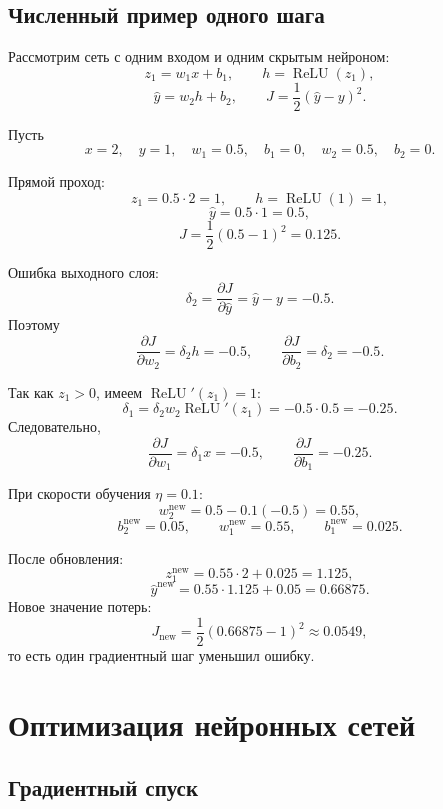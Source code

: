 \documentclass[12pt,a4paper]{article}
\theoremstyle{definition}
\newcommand{\1}{\mathbf{1}}
\DeclareMathOperator{\ReLU}{ReLU}
\begin{document}
\subsection{Численный пример одного шага}

Рассмотрим сеть с одним входом и одним скрытым нейроном:
\[
    z_1=w_1x+b_1,
    \qquad
    h=\ReLU(z_1),
\]
\[
    \widehat{y}=w_2h+b_2,
    \qquad
    J=\frac{1}{2}(\widehat{y}-y)^2.
\]

Пусть
\[
    x=2,
    \quad
    y=1,
    \quad
    w_1=0.5,
    \quad
    b_1=0,
    \quad
    w_2=0.5,
    \quad
    b_2=0.
\]

Прямой проход:
\[
    z_1=0.5\cdot2=1,
    \qquad
    h=\ReLU(1)=1,
\]
\[
    \widehat{y}=0.5\cdot1=0.5,
\]
\[
    J=\frac{1}{2}(0.5-1)^2=0.125.
\]

Ошибка выходного слоя:
\[
    \delta_2
    =
    \frac{\partial J}{\partial\widehat{y}}
    =
    \widehat{y}-y=-0.5.
\]
Поэтому
\[
    \frac{\partial J}{\partial w_2}
    =
    \delta_2h=-0.5,
    \qquad
    \frac{\partial J}{\partial b_2}
    =
    \delta_2=-0.5.
\]

Так как $z_1>0$, имеем $\ReLU'(z_1)=1$:
\[
    \delta_1
    =
    \delta_2w_2\ReLU'(z_1)
    =
    -0.5\cdot0.5=-0.25.
\]
Следовательно,
\[
    \frac{\partial J}{\partial w_1}
    =
    \delta_1x=-0.5,
    \qquad
    \frac{\partial J}{\partial b_1}
    =
    -0.25.
\]

При скорости обучения $\eta=0.1$:
\[
    w_2^{\mathrm{new}}
    =
    0.5-0.1(-0.5)=0.55,
\]
\[
    b_2^{\mathrm{new}}=0.05,
    \qquad
    w_1^{\mathrm{new}}=0.55,
    \qquad
    b_1^{\mathrm{new}}=0.025.
\]

После обновления:
\[
    z_1^{\mathrm{new}}=0.55\cdot2+0.025=1.125,
\]
\[
    \widehat{y}^{\mathrm{new}}
    =
    0.55\cdot1.125+0.05
    =
    0.66875.
\]
Новое значение потерь:
\[
    J_{\mathrm{new}}
    =
    \frac{1}{2}(0.66875-1)^2
    \approx0.0549,
\]
то есть один градиентный шаг уменьшил ошибку.

\section{Оптимизация нейронных сетей}

\subsection{Градиентный спуск}
\end{document}

